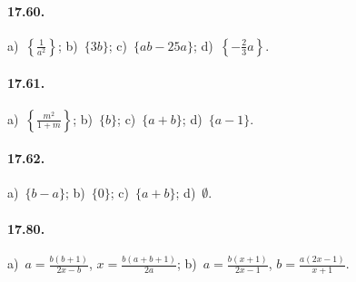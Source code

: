 \paragraph{17.60.} %
a)~$\left\{\frac{1}{a^{2}}\right\}$; \quad b)~$\{3b\}$; \quad c)~$\{ab-25a\}$; \quad d)~$\left\{-\frac{2}{3}a\right\}$.

\paragraph{17.61.} %
a)~$\left\{\frac{m^{2}}{1+m}\right\}$; \quad b)~$\{b\}$; \quad c)~$\{a+b\}$; \quad d)~$\{a-1\}$.

\paragraph{17.62.} %
a)~$\{b-a\}$; \quad b)~$\{0\}$; \quad c)~$\{a+b\}$; \quad d)~$\emptyset$.

\paragraph{17.80.}
a)~$a=\frac{b(b+1)}{2x-b}$, $x=\frac{b(a+b+1)}{2a}$;
\quad b)~$a=\frac{b(x+1)}{2x-1}$, $b=\frac{a(2x-1)}{x+1}$.
